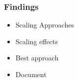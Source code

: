 \begin{frame}
\frametitle{Findings}

\begin{itemize}
	\item Scaling Approaches
	\item Scaling effects
	\item Best approach
	\item Document
\end{itemize}

\end{frame}